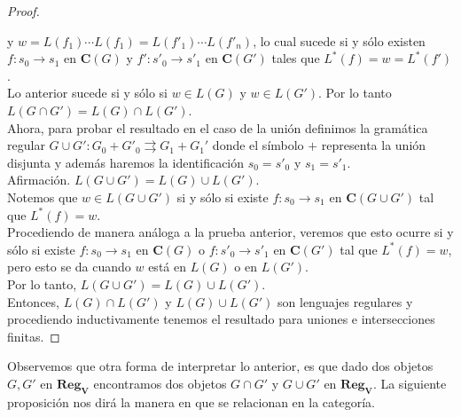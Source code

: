 \documentclass[../main.tex]{subfiles}
\begin{document}
\begin{proof}
\begin{multicols}{2}
 		\begin{center}
 		\end{center}
 	\end{multicols}
    \noindent y $w=L(f_1)\cdots L(f_1)=L(f'_1)\cdots L(f'_n)$, lo cual sucede si y sólo existen $f:s_0 \to s_1$ en $\mathbf{C}(G)$ y $f': s'_0 \to s'_1$ en $\mathbf{C}(G')$ tales que $L^*(f)=w=L^*(f')$. \\
    Lo anterior sucede si y sólo si $w \in L(G)$ y $w \in L(G')$. Por lo tanto $L(G\cap G')=L(G) \cap L(G')$. \\
 	Ahora, para probar el resultado en el caso de la unión definimos la gramática regular $G \cup G':G_0+G'_0 \rightrightarrows G_1+G_1'$ donde el símbolo $+$ representa la unión disjunta y además haremos la identificación $s_0=s'_0$ y $s_1=s'_1$. \\
 	Afirmación. $L(G \cup G') = L(G) \cup L(G')$. \\
 	Notemos que $w \in L(G \cup G')$ si y sólo si existe $f:s_0 \to s_1$ en $\mathbf{C}(G \cup G')$ tal que $L^*(f)=w$. \\
 	Procediendo de manera análoga a la prueba anterior, veremos que esto ocurre si y sólo si existe $f:s_0 \to s_1$ en $\mathbf{C}(G)$ o $f:s'_0 \to s'_1$ en $\mathbf{C}(G')$ tal que $L^*(f)=w$, pero esto se da cuando $w$ está en $L(G)$ o en $L(G')$. \\
 	Por lo tanto, $L(G\cup G') = L(G)\cup L(G')$. \\
 	Entonces, $L(G)\cap L(G')$ y $L(G)\cup L(G')$ son lenguajes regulares y procediendo inductivamente tenemos el resultado para uniones e intersecciones finitas. 
 \end{proof}
 
 Observemos que otra forma de interpretar lo anterior, es que dado dos objetos $G,G'$ en $\mathbf{Reg_V}$ encontramos dos objetos $G\cap G'$ y $G\cup G'$ en $\mathbf{Reg_V}$. La siguiente proposición nos dirá la manera en que se relacionan en la categoría. 
 
\end{document}
